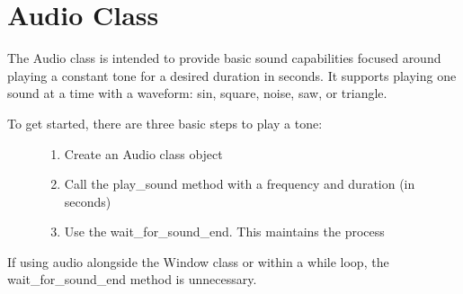 \documentclass[letterpaper,10pt,english,openany,oneside]{sphinxmanual}
\begin{document}
\chapter{Audio Class}
\label{\detokenize{fundamentals:audio-class}}
\sphinxAtStartPar
The Audio class is intended to provide basic sound capabilities focused around playing a constant tone for a desired duration in seconds. It supports playing one sound at a time with a waveform: sin, square, noise, saw, or triangle.
\begin{description}
\item[{To get started, there are three basic steps to play a tone:}] \leavevmode\begin{enumerate}
%
\item {} 
\sphinxAtStartPar
Create an Audio class object

\item {} 
\sphinxAtStartPar
Call the play\_sound method with a frequency and duration (in seconds)

\item {} 
\sphinxAtStartPar
Use the wait\_for\_sound\_end. This maintains the process

\end{enumerate}

\end{description}
\def\sphinxLiteralBlockLabel{\label{\detokenize{fundamentals:id2}}}
\begin{sphinxVerbatim}[commandchars=\\\{\}]
   
   
   

  
\end{sphinxVerbatim}

\sphinxAtStartPar
If using audio alongside the Window class or within a while loop, the wait\_for\_sound\_end method is unnecessary.
\def\sphinxLiteralBlockLabel{\label{\detokenize{fundamentals:id3}}}
\begin{sphinxVerbatim}[commandchars=\\\{\}]
   
   
   

  
      
\end{sphinxVerbatim}
\end{document}
